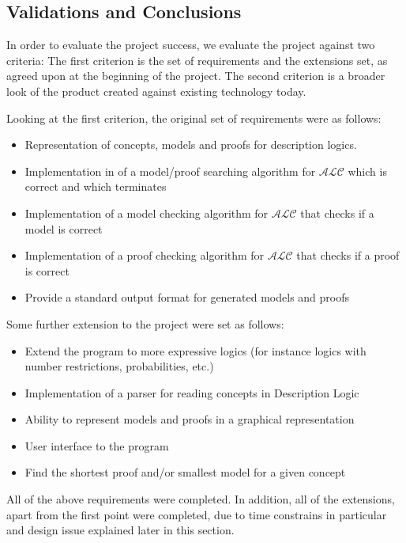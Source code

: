 \subsection {Validations and Conclusions}

In order to evaluate the project success, we evaluate the project against two criteria:
The first criterion is the set of requirements and the extensions set, as agreed upon at the beginning of the project.
The second criterion is a broader look of the product created against existing technology today.

Looking at the first criterion, the original set of requirements were as follows:

\begin{itemize}
\item Representation of concepts, models and proofs for description logics.
\item Implementation in of a model/proof searching algorithm for $\mathcal{ALC}$ which is correct and which terminates
\item Implementation of a model checking algorithm for $\mathcal{ALC}$ that checks
if a model is correct
\item Implementation of a proof checking algorithm for $\mathcal{ALC}$ that checks if a proof is correct
\item Provide a standard output format for generated models and proofs 
\end{itemize}

Some further extension to the project were set as follows:

\begin{itemize}
\item Extend the program to more expressive logics (for instance logics with number restrictions, probabilities, etc.)
\item Implementation of a parser for reading concepts in Description Logic
\item Ability to represent models and proofs in a graphical representation
\item User interface to the program
\item Find the shortest proof and/or smallest model for a given concept
\end{itemize}

All of the above requirements were completed. In addition, all of the extensions, apart from the first point were completed, due to time constrains in particular and design issue explained later in this section. 

